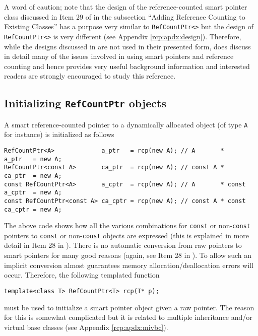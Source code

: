 A word of caution; note that the design of the reference-counted smart
pointer class discussed in Item 29 of {}\cite{ref:meyers_1996} in the
subsection ``Adding Reference Counting to Existing Classes'' has a
purpose very similar to {}\texttt{RefCountPtr<>} but the design of
{}\texttt{RefCountPtr<>} is very different (see Appendix
{}\ref{rcp:apdx:design}).  Therefore, while the designs discussed in
{}\cite{ref:meyers_1996} are not used in their presented form,
{}\cite{ref:meyers_1996} does discuss in detail many of the issues
involved in using smart pointers and reference counting and hence
provides very useful background information and interested readers are
strongly encouraged to study this reference.

%
\subsection{Initializing {}\texttt{RefCountPtr} objects}
\label{rcp:sec:init-rcp-objects}
%

A smart reference-counted pointer to a dynamically allocated object
(of type {}\texttt{A} for instance) is initialized as follows

{\scriptsize\begin{verbatim}
RefCountPtr<A>             a_ptr   = rcp(new A); // A       *       a_ptr   = new A;
RefCountPtr<const A>       ca_ptr  = rcp(new A); // const A *       ca_ptr  = new A;
const RefCountPtr<A>       a_cptr  = rcp(new A); // A       * const a_cptr  = new A;
const RefCountPtr<const A> ca_cptr = rcp(new A); // const A * const ca_cptr = new A;
\end{verbatim}}

The above code shows how all the various combinations for
{}\texttt{const} or non-{}\texttt{const} pointers to {}\texttt{const}
or non-{}\texttt{const} objects are expressed (this is explained in
more detail in Item 28 in {}\cite{ref:meyers_1996}).  There is no
automatic conversion from raw pointers to smart pointers for many good
reasons (again, see Item 28 in {}\cite{ref:meyers_1996}).  To allow such
an implicit conversion almost guarantees memory
allocation/deallocation errors will occur.  Therefore, the following
templated function

{\scriptsize\begin{verbatim}
template<class T> RefCountPtr<T> rcp(T* p);
\end{verbatim}}

{}\noindent{}must be used to initialize a smart pointer object given a
raw pointer.  The reason for this is somewhat complicated but it is
related to multiple inheritance and/or virtual base classes (see
Appendix {}\ref{rcp:apdx:mivbc}).

